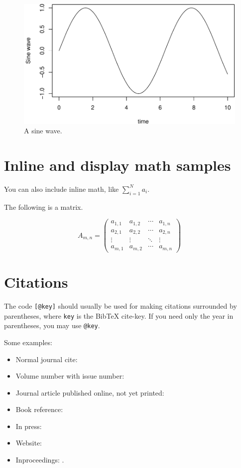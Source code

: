 \documentclass[preprint]{JASA}
\begin{document}
\begin{figure}
\includegraphics[width=\reprintcolumnwidth]{superbowlOT_files/figure-latex/Figure2} \caption{A sine wave.}\label{fig:Figure2}
\end{figure}

\hypertarget{inline-and-display-math-samples}{%
\section{Inline and display math
samples}\label{inline-and-display-math-samples}}

You can also include inline math, like \(\sum\nolimits_{i=1}^N a_i\).

The following is a matrix.

\[
A_{m,n} = 
 \begin{pmatrix}
  a_{1,1} & a_{1,2} & \cdots & a_{1,n} \\
  a_{2,1} & a_{2,2} & \cdots & a_{2,n} \\
  \vdots  & \vdots  & \ddots & \vdots  \\
  a_{m,1} & a_{m,2} & \cdots & a_{m,n} 
 \end{pmatrix}
\]

\hypertarget{citations}{%
\section{Citations}\label{citations}}

The code \texttt{{[}@key{]}} should usually be used for making citations
surrounded by parentheses, where \texttt{key} is the BibTeX cite-key. If
you need only the year in parentheses, you may use \texttt{@key}.

Some examples:

\begin{itemize}
\item
  Normal journal cite: \citep{joursamp1}
\item
  Volume number with issue number: \citep{joursamp3}
\item
  Journal article published online, not yet printed: \citep[published
  online,][]{sampMisc2}
\item
  Book reference: \citep{booksamp1}
\item
  In press: \citep[in press,][]{inpress2}
\item
  Website: \citep{websiteauthyear}
\item
  Inproceedings: \citep{sampinproceedings3}.
\end{itemize}
\end{document}
